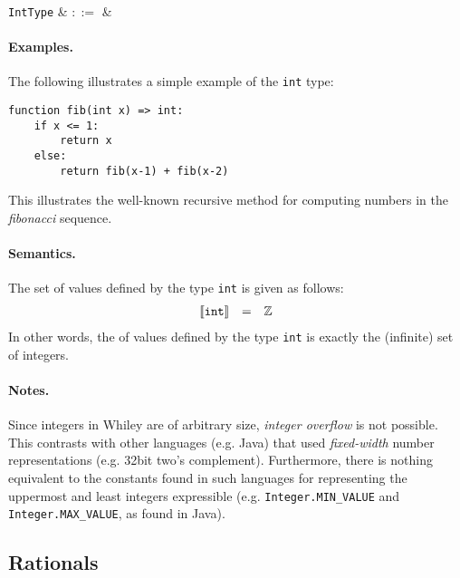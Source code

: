 \begin{syntax}
  \verb+IntType+ & $::=$ &  \\
\end{syntax}

\paragraph{Examples.}  The following illustrates a simple example of the \lstinline{int} type:

\begin{lstlisting}
function fib(int x) => int:
    if x <= 1:
        return x
    else:
        return fib(x-1) + fib(x-2)
\end{lstlisting}
This illustrates the well-known recursive method for computing numbers in the {\em fibonacci} sequence.

\paragraph{Semantics.}  The set of values defined by the type \lstinline{int} is given as follows:
\begin{displaymath}
\begin{array}{rcl}
{\tt\llbracket int\rrbracket} & = & {\tt\mathbb{Z}}\\
\end{array}
\end{displaymath}
In other words, the of values defined by the type \lstinline{int} is exactly the (infinite) set of integers.

\paragraph{Notes.}  Since integers in Whiley are of arbitrary size, {\em integer overflow} is not possible.  This contrasts with other languages (e.g. Java) that used {\em fixed-width} number representations (e.g. 32bit two's complement).  Furthermore, there is nothing equivalent to the constants found in such languages for representing the uppermost and least integers expressible (e.g. \lstinline{Integer.MIN_VALUE} and \lstinline{Integer.MAX_VALUE}, as found in Java).

\subsection{Rationals}
\label{c_types_real}

